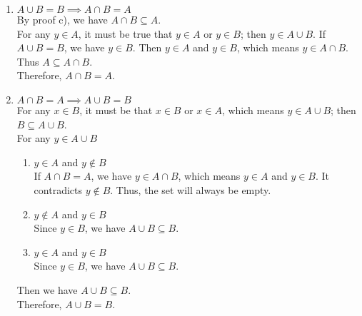 \documentclass[12pt]{article}
\begin{document}
\begin{flushleft}
\begin{enumerate}
    \item \(A \cup B = B \implies A \cap B = A\)\\
    By proof c), we have \(A \cap B \subseteq A\).\\
    For any \(y \in A\), it must be true that \(y \in A\) or \(y \in B\); then \(y \in A \cup B\). If \(A \cup B = B\), we have \(y \in B\). Then \(y \in A\) and \(y \in B\), which means \(y \in A \cap B\). Thus \(A \subseteq A \cap B\).\\
    Therefore, \(A \cap B = A\).

    \item \(A \cap B =A \implies A \cup B =B \)\\
    For any \(x \in B\), it must be that \(x \in B\) or \(x \in A\), which means \(y \in A \cup B\); then \(B \subseteq A \cup B\).\\
    For any \(y \in A \cup B\)
    \begin{enumerate}
        \item \(y \in A \) and \(y \notin B\)\\
        If \(A \cap B =A\), we have \(y \in A \cap B\), which means \(y \in A \) and \(y \in B\).
        It contradicts \(y \notin B\).
        Thus, the set will always be empty.

        \item \(y \notin A\) and \(y \in B\)\\
        Since \(y \in B\), we have \(A \cup B \subseteq B\).

        \item \(y \in A\) and \(y \in B\)\\
        Since \(y \in B\), we have \(A \cup B \subseteq B\).
    \end{enumerate}
    Then we have \(A \cup B \subseteq B\).\\
    Therefore, \(A \cup B = B\).
\end{enumerate}



\end{flushleft}
\end{document}
